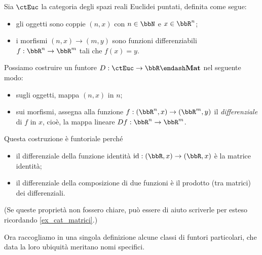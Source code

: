 \begin{example}\label{exa_derivata_funtore}
	Sia \(\ctEuc\) la categoria degli spazi reali Euclidei puntati, definita come segue:
	\begin{itemize}
		\item gli oggetti sono coppie \((n,x)\) con \(n\in\bbN\) e \(x\in\bbR^n\);
		\item i morfismi \((n,x)\to (m,y)\) sono funzioni differenziabili \(f:\bbR^n\to\bbR^m\) tali che \(f(x)=y\).
	\end{itemize}
	Possiamo costruire un funtore \(D:\ctEuc\to\bbR\emdash\cate{Mat}\) nel seguente modo:
	\begin{itemize}
		\item sugli oggetti, mappa \((n,x)\) in \(n\);
		\item sui morfismi, assegna alla funzione \(f:(\bbR^n,x)\to (\bbR^m,y)\) il \emph{differenziale} di \(f\) in \(x\), cioè, la mappa lineare \(Df:\bbR^n\to\bbR^m\).
	\end{itemize}
	Questa costruzione è funtoriale perché
	\begin{itemize}
		\item il differenziale della funzione identità \(\id : (\bbR,x) \to (\bbR,x)\) è la matrice identità;
		\item il differenziale della composizione di due funzioni è il prodotto (tra matrici) dei differenziali.
	\end{itemize}
	(Se queste proprietà non fossero chiare, può essere di aiuto scriverle per esteso ricordando \ref{ex_cat_matrici}.)
\end{example}
Ora raccogliamo in una singola definizione alcune classi di funtori particolari, che data la loro ubiquità meritano nomi specifici.
